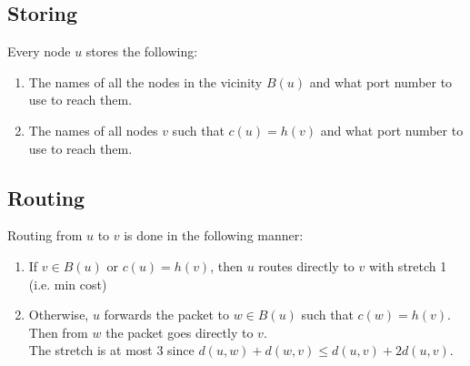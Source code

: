 \subsection{Storing}
Every node $u$ stores the following:
\begin{enumerate}
    \item The names of all the nodes in the vicinity $B(u)$ and what port number to use to reach them.
    \item The names of all nodes $v$ such that $c(u)=h(v)$ and what port number to use to reach them.
\end{enumerate}

\subsection{Routing}
Routing from $u$ to $v$ is done in the following manner:
\begin{enumerate}
    \item If $v\in B(u)$ or $c(u)=h(v)$, then $u$ routes directly to $v$ with stretch 1 (i.e. min cost)
    \item Otherwise, $u$ forwards the packet to $w\in B(u)$ such that $c(w)=h(v)$. Then from $w$ the packet goes directly to $v$.\\
        The stretch is at most $3$ since $d(u,w) + d(w,v) \leq d(u,v)+2d(u,v)$.
\end{enumerate}

